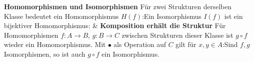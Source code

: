 \begin{BandUebersicht}
\textbf{Homomorphismen und Isomorphismen}
Für zwei Strukturen derselben Klasse bedeutet ein Homomorphismus
\(H(f)\):Ein Isomorphismus \(I(f)\) ist ein bijektiver Homomorphismus:
&
\textbf{Komposition erhält die Struktur}
Für Homomorphismen \(f:A\to B\), \(g:B\to C\) zwischen
Strukturen dieser Klasse ist \(g\circ f\) wieder ein Homomorphismus.
Mit \(\bullet\) als Operation auf \(C\) gilt für \(x,y\in A\):Sind \(f,g\) Isomorphismen, so ist auch \(g\circ f\) ein Isomorphismus.
 \\
\end{BandUebersicht}

